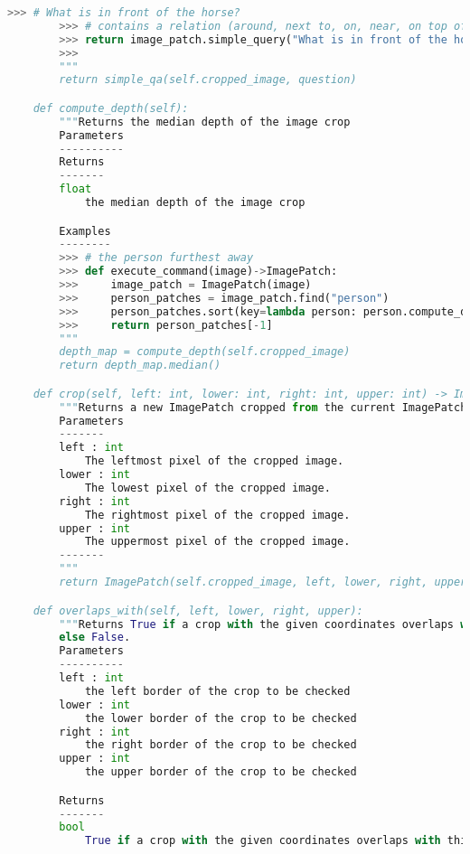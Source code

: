\documentclass[10pt,twocolumn,letterpaper]{article}
\begin{document}
\begin{lstlisting}[language=Python, xleftmargin=.0\textwidth, xrightmargin=.0\textwidth, caption=\textbf{Full API.}, label={listing}]
        >>> # What is in front of the horse?
        >>> # contains a relation (around, next to, on, near, on top of, in front of, behind, etc), so ask directly
        >>> return image_patch.simple_query("What is in front of the horse?")
        >>>
        """
        return simple_qa(self.cropped_image, question)

    def compute_depth(self):
        """Returns the median depth of the image crop
        Parameters
        ----------
        Returns
        -------
        float
            the median depth of the image crop

        Examples
        --------
        >>> # the person furthest away
        >>> def execute_command(image)->ImagePatch:
        >>>     image_patch = ImagePatch(image)
        >>>     person_patches = image_patch.find("person")
        >>>     person_patches.sort(key=lambda person: person.compute_depth())
        >>>     return person_patches[-1]
        """
        depth_map = compute_depth(self.cropped_image)
        return depth_map.median()

    def crop(self, left: int, lower: int, right: int, upper: int) -> ImagePatch:
        """Returns a new ImagePatch cropped from the current ImagePatch.
        Parameters
        -------
        left : int
            The leftmost pixel of the cropped image.
        lower : int
            The lowest pixel of the cropped image.
        right : int
            The rightmost pixel of the cropped image.
        upper : int
            The uppermost pixel of the cropped image.
        -------
        """
        return ImagePatch(self.cropped_image, left, lower, right, upper)

    def overlaps_with(self, left, lower, right, upper):
        """Returns True if a crop with the given coordinates overlaps with this one,
        else False.
        Parameters
        ----------
        left : int
            the left border of the crop to be checked
        lower : int
            the lower border of the crop to be checked
        right : int
            the right border of the crop to be checked
        upper : int
            the upper border of the crop to be checked

        Returns
        -------
        bool
            True if a crop with the given coordinates overlaps with this one, else False


\end{lstlisting}
\end{document}
